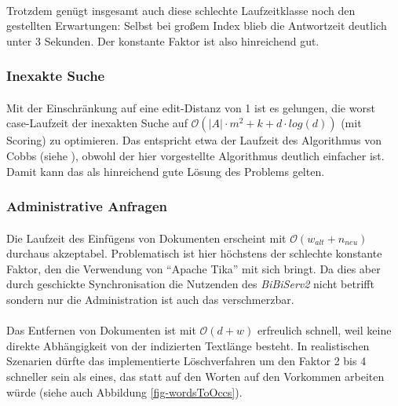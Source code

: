 \paragraph{} Trotzdem genügt insgesamt auch diese schlechte Laufzeitklasse noch den gestellten Erwartungen: Selbst bei großem Index blieb die Antwortzeit deutlich unter 3 Sekunden. Der konstante Faktor ist also hinreichend gut.

\subsubsection{Inexakte Suche}

\paragraph{} Mit der Einschränkung auf eine edit-Distanz von 1 ist es gelungen, die worst case-Laufzeit der inexakten Suche auf $\mathcal{O}(|A| \cdot m^2 + k + d \cdot log(d))$ (mit Scoring) zu optimieren. Das entspricht etwa der Laufzeit des Algorithmus von Cobbs (siehe \cite{approxTreesCobbs}), obwohl der hier vorgestellte Algorithmus deutlich einfacher ist. Damit kann das als hinreichend gute Lösung des Problems gelten.

\subsubsection{Administrative Anfragen}

\paragraph{} Die Laufzeit des Einfügens von Dokumenten erscheint mit $\mathcal{O}(w_{alt} + n_{neu})$ durchaus akzeptabel. Problematisch ist hier höchstens der schlechte konstante Faktor, den die Verwendung von "`Apache Tika"' mit sich bringt. Da dies aber durch geschickte Synchronisation die Nutzenden des \textit{BiBiServ2} nicht betrifft sondern nur die Administration ist auch das verschmerzbar.
\paragraph{} Das Entfernen von Dokumenten ist mit $\mathcal{O}(d + w)$ erfreulich schnell, weil keine direkte Abhängigkeit von der indizierten Textlänge besteht. In realistischen Szenarien dürfte das implementierte Löschverfahren um den Faktor 2 bis 4 schneller sein als eines, das statt auf den Worten auf den Vorkommen arbeiten würde (siehe auch Abbildung \ref{fig-wordsToOccs}).

